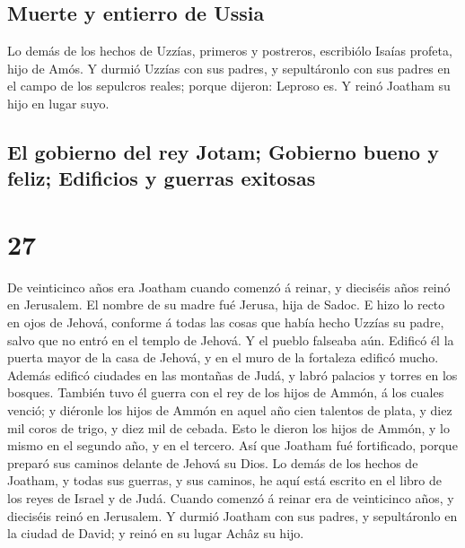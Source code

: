 \hypertarget{muerte-y-entierro-de-ussia}{%
\subsection{Muerte y entierro de
Ussia}\label{muerte-y-entierro-de-ussia}}

 Lo demás de los hechos de Uzzías, primeros y postreros,
escribiólo Isaías profeta, hijo de Amós.  Y durmió Uzzías
con sus padres, y sepultáronlo con sus padres en el campo de los
sepulcros reales; porque dijeron: Leproso es. Y reinó Joatham su hijo en
lugar suyo.

\hypertarget{el-gobierno-del-rey-jotam-gobierno-bueno-y-feliz-edificios-y-guerras-exitosas}{%
\subsection{El gobierno del rey Jotam; Gobierno bueno y feliz; Edificios
y guerras
exitosas}\label{el-gobierno-del-rey-jotam-gobierno-bueno-y-feliz-edificios-y-guerras-exitosas}}

\hypertarget{section-26}{%
\section{27}\label{section-26}}

 De veinticinco años era Joatham cuando comenzó á reinar, y
dieciséis años reinó en Jerusalem. El nombre de su madre fué Jerusa,
hija de Sadoc.  E hizo lo recto en ojos de Jehová, conforme
á todas las cosas que había hecho Uzzías su padre, salvo que no entró en
el templo de Jehová. Y el pueblo falseaba aún.  Edificó él
la puerta mayor de la casa de Jehová, y en el muro de la fortaleza
edificó mucho.  Además edificó ciudades en las montañas de
Judá, y labró palacios y torres en los bosques.  También
tuvo él guerra con el rey de los hijos de Ammón, á los cuales venció; y
diéronle los hijos de Ammón en aquel año cien talentos de plata, y diez
mil coros de trigo, y diez mil de cebada. Esto le dieron los hijos de
Ammón, y lo mismo en el segundo año, y en el tercero.  Así
que Joatham fué fortificado, porque preparó sus caminos delante de
Jehová su Dios.  Lo demás de los hechos de Joatham, y todas
sus guerras, y sus caminos, he aquí está escrito en el libro de los
reyes de Israel y de Judá.  Cuando comenzó á reinar era de
veinticinco años, y dieciséis reinó en Jerusalem.  Y durmió
Joatham con sus padres, y sepultáronlo en la ciudad de David; y reinó en
su lugar Achâz su hijo.

